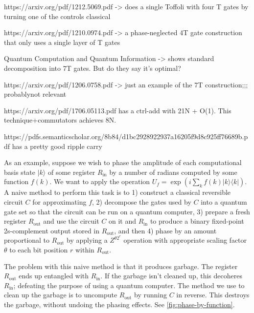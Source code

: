 \documentclass[twocolumn,longbibliography]{quantumarticle-customized}
\begin{document}
https://arxiv.org/pdf/1212.5069.pdf  ->   does a single Toffoli with four T gates by turning one of the controls classical

https://arxiv.org/pdf/1210.0974.pdf  ->   a phase-neglected 4T gate construction that only uses a single layer of T gates


Quantum Computation and Quantum Information -> shows standard decomposition into 7T gates. But do they say it's optimal?

https://arxiv.org/pdf/1206.0758.pdf -> just an example of the 7T construction;;; probablynot relevant



https://arxiv.org/pdf/1706.05113.pdf   has a ctrl-add with 21N + O(1). This technique+commutators achieves 8N.


https://pdfs.semanticscholar.org/8b84/d1bc2928922937a16205f9d8c925ff76689b.pdf     has a pretty good ripple carry








As an example, suppose we wish to phase the amplitude of each computational basis state $|k\rangle$ of some register $R_{\text{in}}$ by a number of radians computed by some function $f(k)$.
We want to apply the operation $U_f = \exp\left( i \sum_k f(k) |k\rangle \langle k| \right)$.
A naive method to perform this task is to 1) construct a classical reversible circuit $C$ for approximating $f$, 2) decompose the gates used by $C$ into a quantum gate set so that the circuit can be run on a quantum computer, 3) prepare a fresh register $R_\text{out}$ and use the circuit $C$ on it and $R_\text{in}$ to produce a binary fixed-point 2s-complement output stored in $R_{\text{out}}$, and then 4) phase by an amount proportional to $R_\text{out}$ by applying a $Z^{\theta 2^r}$ operation with appropriate scaling factor $\theta$ to each bit position $r$ within $R_\text{out}$.

The problem with this naive method is that it produces garbage.
The register $R_\text{out}$ ends up entangled with $R_\text{in}$.
If the garbage isn't cleaned up, this decoheres $R_\text{in}$; defeating the purpose of using a quantum computer.
The method we use to clean up the garbage is to uncompute $R_\text{out}$ by running $C$ in reverse.
This destroys the garbage, without undoing the phasing effects.
See \autoref{fig:phase-by-function}.
\end{document}
